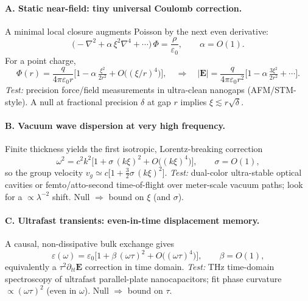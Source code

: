 \paragraph{A. Static near-field: tiny universal Coulomb correction.}
A minimal local closure augments Poisson by the next even derivative:
\begin{equation}
\big(-\nabla^2 + \alpha\,\xi^2 \nabla^4 + \cdots\big)\,\Phi
=\frac{\rho}{\varepsilon_0},\qquad \alpha=O(1).
\end{equation}
For a point charge,
\begin{equation}
\Phi(r)=\frac{q}{4\pi\varepsilon_0 r}
\Big[1-\alpha\,\tfrac{\xi^2}{2r^2}+O\big((\xi/r)^4\big)\Big],
\quad
\Rightarrow\quad
|\mathbf E|=\frac{q}{4\pi\varepsilon_0 r^2}\Big[1-\alpha\,\tfrac{3\xi^2}{2r^2}+\cdots\Big].
\end{equation}
\emph{Test:} precision force/field measurements in ultra-clean nanogaps (AFM/STM-style). A null at fractional precision $\delta$ at gap $r$ implies $\xi \lesssim r\sqrt{\delta}$.

\paragraph{B. Vacuum wave dispersion at very high frequency.}
Finite thickness yields the first isotropic, Lorentz-breaking correction
\begin{equation}
\omega^2=c^2 k^2\Big[1+\sigma\,(k\xi)^2+O\big((k\xi)^4\big)\Big],\qquad \sigma=O(1),
\end{equation}
so the group velocity $v_g\simeq c\big[1+\tfrac{3}{2}\sigma\,(k\xi)^2\big]$.
\emph{Test:} dual-color ultra-stable optical cavities or femto/atto-second time-of-flight over meter-scale vacuum paths; look for a $\propto\lambda^{-2}$ shift. Null $\Rightarrow$ bound on $\xi$ (and $\sigma$).

\paragraph{C. Ultrafast transients: even-in-time displacement memory.}
A causal, non-dissipative bulk exchange gives
\begin{equation}
\varepsilon(\omega)=\varepsilon_0\Big[1+\beta\,(\omega\tau)^2+O\big((\omega\tau)^4\big)\Big],\qquad \beta=O(1),
\end{equation}
equivalently a $\tau^2\partial_{tt}\mathbf E$ correction in time domain.
\emph{Test:} THz time-domain spectroscopy of ultrafast parallel-plate nanocapacitors; fit phase curvature $\propto(\omega\tau)^2$ (even in $\omega$). Null $\Rightarrow$ bound on $\tau$.

